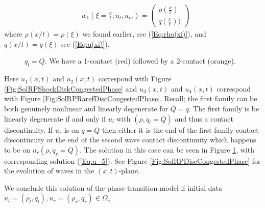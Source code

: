 \documentclass[10pt]{article}
\numberwithin{equation}{section}
\begin{document}
\begin{align*}
   & w_1(\xi = \frac{x}{t} ; u_l, u_m) = \begin{pmatrix} \rho(\frac{x}{t})  \\ q(\frac{x}{t}) ) \end{pmatrix} 
\end{align*}
where $\rho(x/t) = \rho(\xi)$ we found earlier, see (\ref{Eq:rho(xi)}), and $q(x/t) = q(\xi)$ see (\ref{Eq:q(xi)}). 

%   
\begin{figure}
    \centering 
   
   \caption{$q_l = Q$. We have a 1-contact (red) followed by a 2-contact (orange).}
    \label{Fig:u_5}
\end{figure}
Here $u_1(x,t)$ and $u_2(x,t)$ correspond with Figure \ref{Fig:SolRPShockDiskCongestedPhase} and $u_3(x,t)$ and $u_4(x,t)$ correspond with Figure \ref{Fig:SolRPRarefDiscCongestedPhase}. 
Recall; the first family can be both genuinely nonlinear and linearly degenerate for $Q = q$. The first family is be linearly degenerate if and only if $u_l$ with $(\rho, q_l = Q)$ and thus a contact discontinuity.  If $u_r$ is on $q = Q$ then either it is the end of the first family contact discontinuity or the end of the second wave contact discontinuity which happens to be on $u_r(\rho, q_r = Q)$. The solution in this case can be seen in Figure \ref{Fig:u_5}, with corresponding solution (\ref{Eq:u_5}). See Figure \ref{Fig:SolRPDiscCongestedPhase} for the evolution of waves in the $(x,t)$-plane.

We conclude this solution of the phase transition model if initial data $u_l = (\rho_l, q_l), u_r = (\rho_r, q_r) \in \Omega_c $
\end{document}
